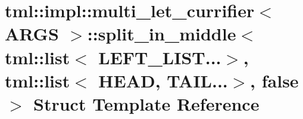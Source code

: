 \hypertarget{structtml_1_1impl_1_1multi__let__currifier_1_1split__in__middle_3_01tml_1_1list_3_01LEFT__LIST_843785e5577dc8253b5980b3ba33c2080}{\section{tml\+:\+:impl\+:\+:multi\+\_\+let\+\_\+currifier$<$ A\+R\+G\+S $>$\+:\+:split\+\_\+in\+\_\+middle$<$ tml\+:\+:list$<$ L\+E\+F\+T\+\_\+\+L\+I\+S\+T...$>$, tml\+:\+:list$<$ H\+E\+A\+D, T\+A\+I\+L...$>$, false $>$ Struct Template Reference}
\label{structtml_1_1impl_1_1multi__let__currifier_1_1split__in__middle_3_01tml_1_1list_3_01LEFT__LIST_843785e5577dc8253b5980b3ba33c2080}
}
